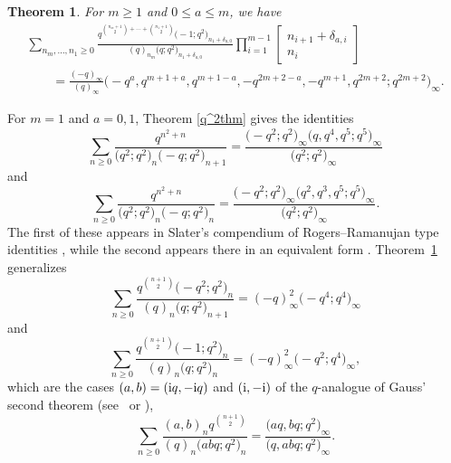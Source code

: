 \documentclass[pdftex]{sigma}
\newtheorem{Theorem}{Theorem}[section]
\numberwithin{equation}{section}
\begin{document}
\begin{Theorem} \label{strangesignthm}
	For $m \geq 1$ and $0 \leq a \leq {m}$, we have
	\begin{gather}
			\sum_{n_m, \dots, n_1 \geq 0} \frac{q^{\binom{n_m+1}{2} + \cdots + \binom{n_1+1}{2}}\bigl(-1;q^2\bigr)_{n_1 + \delta_{a,0}}}{(q)_{n_m}\bigl(q;q^2\bigr)_{n_1+ \delta_{a,0}}} \prod_{i=1}^{m-1} \begin{bmatrix} n_{i+1} + \delta_{a,i} \\ n_i \end{bmatrix} \nonumber\\
			\qquad{}= \frac{(-q)_{\infty}}{(q)_{\infty}} \bigl(-q^a,q^{m+1+a},q^{m+1-a},-q^{2m+2-a},-q^{m+1},q^{2m+2};q^{2m+2}\bigr)_{\infty}.
\label{strangesignex}
	\end{gather}
\end{Theorem}
For $m = 1$ and $a=0,1$, Theorem \ref{q^2thm} gives the identities
\begin{equation*}
	\sum_{n \geq 0} \frac{q^{n^2+n}}{\bigl(q^2;q^2\bigr)_n\bigl(-q;q^2\bigr)_{n+1}} = \frac{\bigl(-q^2;q^2\bigr)_{\infty}\bigl(q,q^4,q^5;q^5\bigr)_{\infty}}{\bigl(q^2;q^2\bigr)_{\infty}}
\end{equation*}
and
\begin{equation*}
	\sum_{n \geq 0} \frac{q^{n^2+n}}{\bigl(q^2;q^2\bigr)_n\bigl(-q;q^2\bigr)_{n}} = \frac{\bigl(-q^2;q^2\bigr)_{\infty}\bigl(q^2,q^3,q^5;q^5\bigr)_{\infty}}{\bigl(q^2;q^2\bigr)_{\infty}}.
\end{equation*}
The first of these appears in Slater's compendium of Rogers--Ramanujan type identities \cite[equation~(17)]{Sl2}, while the second appears there in an equivalent form \cite[equation~(99)]{Sl2}. Theorem~\ref{strangesignthm} generalizes
\begin{equation*}
	\sum_{n \geq 0} \frac{q^{\binom{n+1}{2}}\bigl(-q^2;q^2\bigr)_n}{(q)_n\bigl(q;q^2\bigr)_{n+1}} = (-q)_{\infty}^2\bigl(-q^4;q^4\bigr)_{\infty}
\end{equation*}
and
\begin{equation*}
	\sum_{n \geq 0} \frac{q^{\binom{n+1}{2}}\bigl(-1;q^2\bigr)_n}{(q)_n\bigl(q;q^2\bigr)_{n}} = (-q)_{\infty}^2\bigl(-q^2;q^4\bigr)_{\infty},
\end{equation*}
which are the cases $(a,b) =({\rm i}q,-{\rm i}q)$
and $({\rm i},-{\rm i})$ of the $q$-analogue of Gauss' second theorem (see~\cite[equa\-tion~(1.8)]{AndKummer} or \cite[Appendix II, equation~(II.11)]{GR}),
\begin{equation*}
	\sum_{n \geq 0} \frac{(a,b)_nq^{\binom{n+1}{2}}}{(q)_n\bigl(abq;q^2\bigr)_n} = \frac{\bigl(aq,bq;q^2\bigr)_{\infty}}{\bigl(q,abq;q^2\bigr)_{\infty}}.
\end{equation*}
\end{document}
